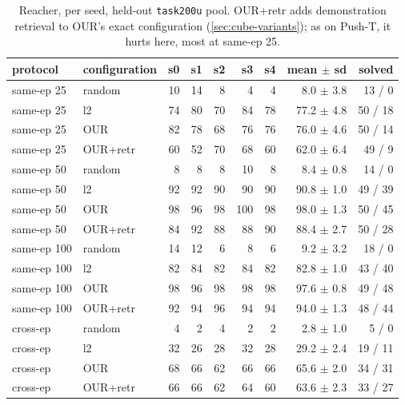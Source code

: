 \documentclass[11pt]{article}
\begin{document}
\begin{table}[H]
\centering\small
\caption{Reacher, per seed, held-out \texttt{task200u} pool. OUR+retr adds demonstration
retrieval to OUR's exact configuration (\cref{sec:cube-variants}); as on Push-T, it hurts
here, most at same-ep 25.}
\begin{tabular}{llrrrrrrr}
\toprule
protocol & configuration & s0 & s1 & s2 & s3 & s4 & mean $\pm$ sd & solved \\
\midrule
same-ep 25 & random & 10 & 14 & 8 & 4 & 4 & 8.0 $\pm$ 3.8 & 13 / 0 \\
same-ep 25 & l2 & 74 & 80 & 70 & 84 & 78 & 77.2 $\pm$ 4.8 & 50 / 18 \\
same-ep 25 & OUR & 82 & 78 & 68 & 76 & 76 & 76.0 $\pm$ 4.6 & 50 / 14 \\
same-ep 25 & OUR+retr & 60 & 52 & 70 & 68 & 60 & 62.0 $\pm$ 6.4 & 49 / 9 \\
\midrule
same-ep 50 & random & 8 & 8 & 8 & 10 & 8 & 8.4 $\pm$ 0.8 & 14 / 0 \\
same-ep 50 & l2 & 92 & 92 & 90 & 90 & 90 & 90.8 $\pm$ 1.0 & 49 / 39 \\
same-ep 50 & OUR & 98 & 96 & 98 & 100 & 98 & 98.0 $\pm$ 1.3 & 50 / 45 \\
same-ep 50 & OUR+retr & 84 & 92 & 88 & 88 & 90 & 88.4 $\pm$ 2.7 & 50 / 28 \\
\midrule
same-ep 100 & random & 14 & 12 & 6 & 8 & 6 & 9.2 $\pm$ 3.2 & 18 / 0 \\
same-ep 100 & l2 & 82 & 84 & 82 & 84 & 82 & 82.8 $\pm$ 1.0 & 43 / 40 \\
same-ep 100 & OUR & 98 & 96 & 98 & 98 & 98 & 97.6 $\pm$ 0.8 & 49 / 48 \\
same-ep 100 & OUR+retr & 92 & 94 & 96 & 94 & 94 & 94.0 $\pm$ 1.3 & 48 / 44 \\
\midrule
cross-ep & random & 4 & 2 & 4 & 2 & 2 & 2.8 $\pm$ 1.0 & 5 / 0 \\
cross-ep & l2 & 32 & 26 & 28 & 32 & 28 & 29.2 $\pm$ 2.4 & 19 / 11 \\
cross-ep & OUR & 68 & 66 & 62 & 66 & 66 & 65.6 $\pm$ 2.0 & 34 / 31 \\
cross-ep & OUR+retr & 66 & 66 & 62 & 64 & 60 & 63.6 $\pm$ 2.3 & 33 / 27 \\
\bottomrule
\end{tabular}
\end{table}
\end{document}

